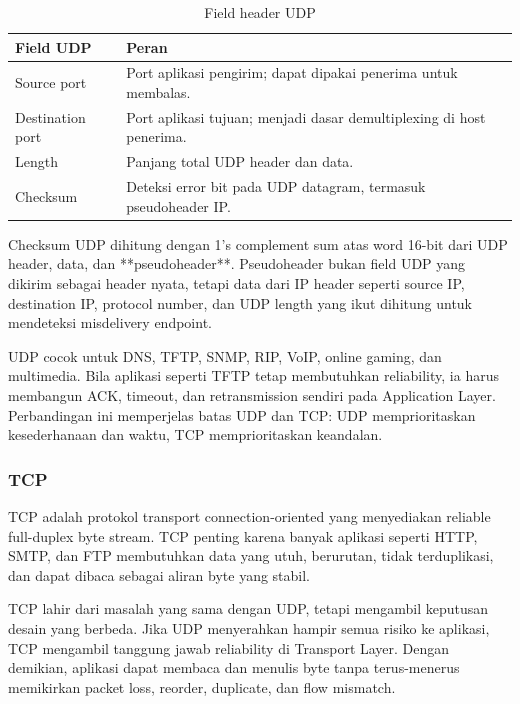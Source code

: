 \begin{table}[H]
\centering
\begin{tabularx}{\textwidth}{|L{0.24\textwidth}|X|}
\hline
\textbf{Field UDP} & \textbf{Peran} \\
\hline
Source port & Port aplikasi pengirim; dapat dipakai penerima untuk membalas. \\
\hline
Destination port & Port aplikasi tujuan; menjadi dasar demultiplexing di host penerima. \\
\hline
Length & Panjang total UDP header dan data. \\
\hline
Checksum & Deteksi error bit pada UDP datagram, termasuk pseudoheader IP. \\
\hline
\end{tabularx}
\caption{Field header UDP}
\label{tab:udp-header}
\end{table}

Checksum UDP dihitung dengan 1's complement sum atas word 16-bit dari UDP header, data, dan **pseudoheader**. Pseudoheader bukan field UDP yang dikirim sebagai header nyata, tetapi data dari IP header seperti source IP, destination IP, protocol number, dan UDP length yang ikut dihitung untuk mendeteksi misdelivery endpoint.

UDP cocok untuk DNS, TFTP, SNMP, RIP, VoIP, online gaming, dan multimedia. Bila aplikasi seperti TFTP tetap membutuhkan reliability, ia harus membangun ACK, timeout, dan retransmission sendiri pada Application Layer. Perbandingan ini memperjelas batas UDP dan TCP: UDP memprioritaskan kesederhanaan dan waktu, TCP memprioritaskan keandalan.

\subsubsection{TCP}
\begin{jawab}
TCP adalah protokol transport connection-oriented yang menyediakan reliable full-duplex byte stream. TCP penting karena banyak aplikasi seperti HTTP, SMTP, dan FTP membutuhkan data yang utuh, berurutan, tidak terduplikasi, dan dapat dibaca sebagai aliran byte yang stabil.
\end{jawab}

TCP lahir dari masalah yang sama dengan UDP, tetapi mengambil keputusan desain yang berbeda. Jika UDP menyerahkan hampir semua risiko ke aplikasi, TCP mengambil tanggung jawab reliability di Transport Layer. Dengan demikian, aplikasi dapat membaca dan menulis byte tanpa terus-menerus memikirkan packet loss, reorder, duplicate, dan flow mismatch.


